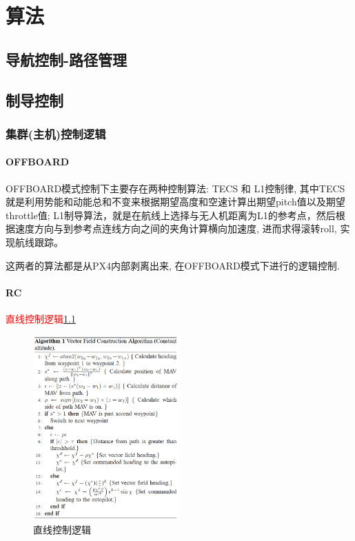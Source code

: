 \chapter{算法}
    \section{导航控制-路径管理}
            
    \section{制导控制} 
        \subsection{集群(主机)控制逻辑}
            \subsubsection{OFFBOARD}
            OFFBOARD模式控制下主要存在两种控制算法: TECS 和 L1控制律, 其中TECS就是利用势能和动能总和不变来根据期望高度和空速计算出期望pitch值以及期望throttle值;
            L1制导算法，就是在航线上选择与无人机距离为L1的参考点，然后根据速度方向与到参考点连线方向之间的夹角计算横向加速度, 进而求得滚转roll, 实现航线跟踪。\par
            这两者的算法都是从PX4内部剥离出来, 在OFFBOARD模式下进行的逻辑控制. 
            \clearpage
            \subsubsection{RC}
            \textcolor{red}{直线控制逻辑\ref{alg:strai}}
            \begin{figure}[htpb]
                \centering
                \includegraphics[width=0.5\textwidth]{pictures/algorithm/straight.png}
                \caption{直线控制逻辑}
                \label{alg:strai}
            \end{figure}
            
